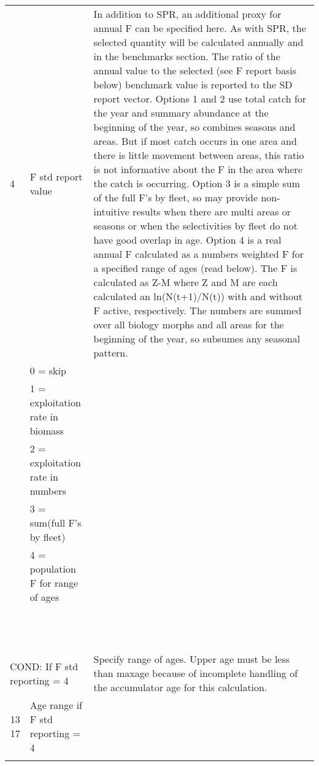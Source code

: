 \begin{landscape}
\begin{longtable}{p{3cm} p{7cm} p{11cm}}
 \hline 
 4 & F std report value &  \multirow{1}{1cm}[-0.1cm]{\parbox{11cm}{In addition to SPR, an additional proxy for annual F can be specified here.  As with SPR, the selected quantity will be calculated annually and in the benchmarks section.  The ratio of the annual value to the selected (see F report basis below) benchmark value is reported to the SD report vector.  Options 1 and 2 use total catch for the year and summary abundance at the beginning of the year, so combines seasons and areas.  But if most catch occurs in one area and there is little movement between areas, this ratio is not informative about the F in the area where the catch is occurring.  Option 3 is a simple sum of the full F’s by fleet, so may provide non-intuitive results when there are multi areas or seasons or when the selectivities by fleet do not have good overlap in age.  Option 4 is a real annual F calculated as a numbers weighted F for a specified range of ages (read below).  The F is calculated as Z-M where Z and M are each calculated an ln(N(t+1)/N(t)) with and without F active, respectively. The numbers are summed over all biology morphs and all areas for the beginning of the year, so subsumes any seasonal pattern.}}\\
  & 0 = skip & \\
  & 1 = exploitation rate in biomass & \\
  & 2 = exploitation rate in numbers & \\
  & 3 = sum(full F's by fleet) & \\
  & 4 = population F for range of ages & \\
  & & \\
  & & \\
  & & \\
  & & \\
  & & \\
  & & \\
  & & \\  
  & & \\
  & & \\
  & & \\  
  & & \\
  & & \\
  
 \multicolumn{2}{l}{COND: If F std reporting = 4 } & \multirow{1}{1cm}[-0.1cm]{\parbox{11cm}{Specify range of ages. Upper age must be less than maxage because of incomplete handling of the accumulator age for this calculation.}} \\
  \multicolumn{1}{r}{13 17}  & Age range if F std reporting = 4 & \\
  \\


\end{longtable}
\end{landscape}
